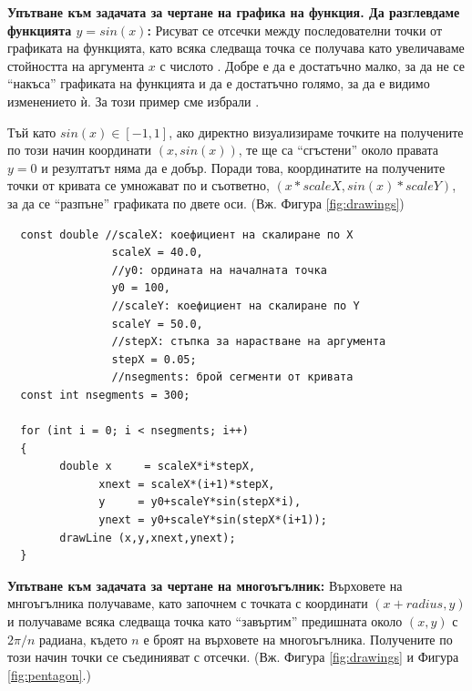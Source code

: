 {\begin{enumerate}[resume]
\begin{mdframed}[hidealllines=true,backgroundcolor=gray!20]
  \textbf {Упътване към задачата за чертане на графика на функция. Да разглевдаме функцията $y=sin(x)$:} Рисуват се отсечки между последователни точки от графиката на функцията, като всяка следваща точка се получава като увеличаваме стойността на аргумента $x$ с числото . Добре е  да е достатъчно малко, за да не се ``накъса'' графиката на функцията и да е достатъчно голямо, за да е видимо изменението ѝ. За този пример сме избрали .
  
  Тъй като $sin(x)\in[-1,1]$, ако директно визуализираме точките на получените по този начин координати $(x,sin(x))$, те ще са ``сгъстени'' около правата $y=0$ и резултатът няма да е добър. Поради това, координатите на получените  точки от кривата се умножават по  и  съответно, $(x * scaleX,sin(x) * scaleY)$, за да се ``разпъне'' графиката по двете оси. (Вж. Фигура \ref{fig:drawings})\\

  \begin{mdframed}[hidealllines=true,backgroundcolor=lightgray!20]
  \begin{verbatim}
  const double //scaleX: коефициент на скалиране по X
                scaleX = 40.0,
                //y0: ордината на началната точка
                y0 = 100,
                //scaleY: коефициент на скалиране по Y
                scaleY = 50.0,
                //stepX: стъпка за нарастване на аргумента
                stepX = 0.05;
                //nsegments: брой сегменти от кривата
  const int nsegments = 300;

  for (int i = 0; i < nsegments; i++)
  {
        double x     = scaleX*i*stepX,
              xnext = scaleX*(i+1)*stepX,
              y     = y0+scaleY*sin(stepX*i),
              ynext = y0+scaleY*sin(stepX*(i+1));
        drawLine (x,y,xnext,ynext);
  }
  \end{verbatim}
  \end{mdframed}

  \end{mdframed}
  
\begin{mdframed}[hidealllines=true,backgroundcolor=gray!20]

\textbf {Упътване към задачата за чертане на многоъгълник:} Върховете на мнгоъгълника получаваме, като започнем с точката с координати $(x+radius,y)$ и получаваме всяка следваща точка като ``завъртим'' предишната около $(x,y)$ с $2\pi/n$ радиана, където $n$ е броят на върховете на многоъгълника. Получените по този начин точки се съединияват с отсечки. (Вж. Фигура \ref{fig:drawings} и Фигура \ref{fig:pentagon}.)\\


\end{mdframed}
\end{enumerate}}
